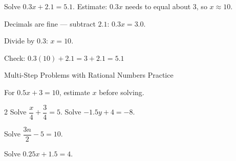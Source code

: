 \begin{stepExample}{Solve $0.3x + 2.1 = 5.1$.}
     Estimate: $0.3x$ needs to equal about $3$, so $x \approx 10$.

     Decimals are fine --- subtract $2.1$: $0.3x = 3.0$.

     Divide by $0.3$: $x = 10$.

     Check: $0.3(10) + 2.1 = 3 + 2.1 = 5.1$ \checkmark
\end{stepExample}


\newpage
\begin{stepPractice}{Multi-Step Problems with Rational Numbers Practice}
    \resetProblems

    \prob For $0.5x + 3 = 10$, estimate $x$ before solving. \answerBlank[2cm]

    \begin{multicols}{2}
    \prob Solve $\dfrac{x}{4} + \dfrac{3}{4} = 5$. \answerBlank[2cm]
    \prob Solve $-1.5y + 4 = -8$. \answerBlank[2cm]
    \end{multicols}

    \prob Solve $\dfrac{3n}{2} - 5 = 10$. \answerBlank[2cm]

    \prob Solve $0.25x + 1.5 = 4$. \answerBlank[2cm]

\end{stepPractice}
